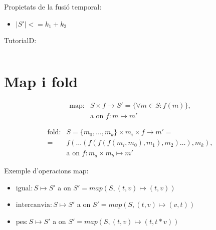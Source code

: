 Propietats de la fusió temporal:
\begin{itemize}
\item $|S'| <= k_1 + k_2$
\end{itemize}





TutorialD:
\begin{verbatim}

\end{verbatim}







\section{Map i fold}

\begin{align*}
  \text{map}:& S \times f \longrightarrow S' = \{\forall m\in S : f(m) \}, \\
             & \text{a on } f: m \mapsto m' 
\end{align*}





\begin{align*}
  \text{fold}: & S=\{m_0,\dotsc,m_k\} \times m_i \times f \longrightarrow m'= \\
               =& f(\dots(f(f(f(m_i,m_0),m_1),m_2)\dots),m_k), \\
               & \text{a on } f: m_a \times m_b \mapsto m'
\end{align*}












Exemple d'operacions map:
\begin{itemize}
\item $\text{igual}: S \mapsto S'$ a on $S'= map(S,(t,v)\mapsto(t,v))$
\item $\text{intercanvia}: S \mapsto S'$ a on $S'= map(S,(t,v)\mapsto(v,t))$
\item $\text{pes}: S \mapsto S'$ a on $S'= map(S,(t,v)\mapsto(t,t*v))$
\end{itemize}


